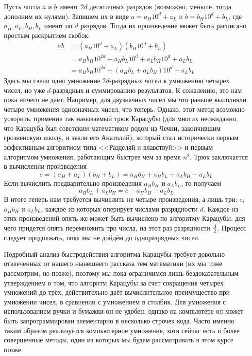 Пусть числа $a$ и $b$ имеют $2d$ десятичных разрядов (возможно, меньше, тогда дополним их нулями). Запишем их в виде $a = a_H10^d + a_L$ и $b = b_H10^d + b_L$, где $a_H, a_L, b_H, b_L$ имеют по $d$ разрядов. Тогда их произведение может быть расписано простым раскрытием скобок:
\begin{align*}
ab &= (a_H10^d + a_L)(b_H10^d + b_L) \\
         &= a_Hb_H10^{2d} + a_Hb_L10^d + a_Lb_H10^d + a_Lb_L\\
         &= a_Hb_H10^{2d} + (a_Hb_L + a_Lb_H)10^d + a_Lb_L
\end{align*}
Здесь мы свели одно умножение $2d$-разрядных чисел к умножению четырех чисел, но уже $d$-разрядных и суммированию результатов. К сожалению, это нам пока ничего не даёт. Например, для двузначных чисел мы что раньше выполняли четыре умножения однозначных чисел, что теперь. Однако, этот метод возможно ускорить, применив так называемый трюк Карацубы (для многих неожиданно, что Карацуба был советским математиком родом из Чечни, закончившим грозненскую школу, и звали его Анатолий), который стал исторически первым эффективным алгоритмом типа <<Разделяй и влавствуй>> и первым алгоритмом умножения, работающим быстрее чем за время $n^2$. Трюк заключается в вычислении произведения
$$c = (a_H + a_L)(b_H + b_L) = a_Hb_H + a_Hb_L + a_Lb_H + a_Lb_L$$
Если вычислить предварительно произведения $a_Hb_H$ и $a_Lb_L$, то получаем
$$a_Hb_L + a_Lb_H = c - a_Hb_H - a_Lb_L$$
В итоге теперь нам требуется вычислить не четыре произведения, а лишь три: $c$, $a_Hb_H$ и $a_Lb_L$, каждое из которых оперирует числами разрядности $d$. Каждое из этих произведений опять же может быть вычислено по алгоритму Карацубы, для чего придется опять перемножить три числа, на этот раз разрядности $d \over 2$. Процесс следует продолжать, пока мы не дойдём до одноразрядных чисел.

Подробный анализ быстродействия алгоритма Карацубы требует довольно отвлеченных от нашего нынешнего рассказа тем математики (их мы тоже рассмотрим, но позже), поэтому мы пока ограничимся лишь бездоказательным утверждением о том, что алгоритм Карацубы за счет сокращения четырех умножений до трёх, действительно даёт вычислительное преимущество при умножении чисел, в сравнении с умножением в столбик. Для умножения с использованием ручки и бумажки он не удобен, однако на компьютере он может быть запрограммирован элементарно в несколько строчек кода. Часто именно таким образом реализуется компьютерное умножение, хотя сейчас есть и более совершенные методы, один из которых мы будем рассматривать в этом курсе позже.

